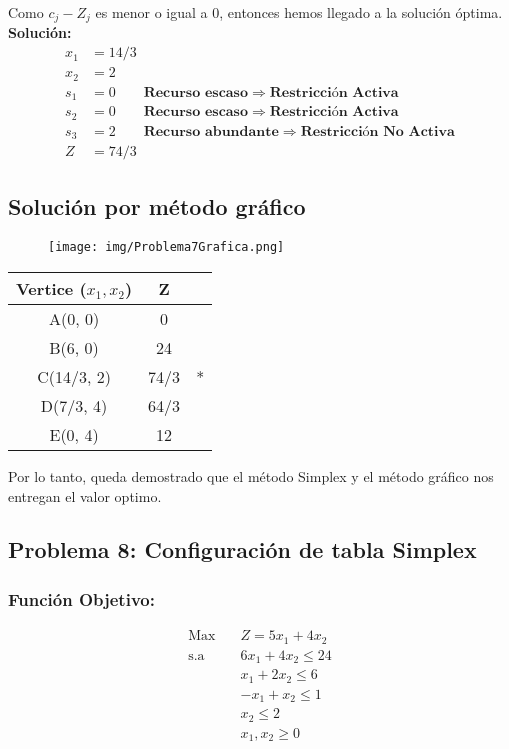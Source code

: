 \documentclass{templateNote}
\begin{document}
Como $c_j - Z_j$ es menor o igual a 0, entonces hemos llegado a la solución óptima.
\textbf{Solución:}
\begin{align*}
    x_1 &= 14/3 \\
    x_2 &= 2 \\
    s_1 &= 0 \qquad \textbf{Recurso escaso} \Rightarrow \textbf{Restricción Activa}\\
    s_2 &= 0 \qquad \textbf{Recurso escaso} \Rightarrow \textbf{Restricción Activa}\\
    s_3 &= 2 \qquad \textbf{Recurso abundante} \Rightarrow \textbf{Restricción No Activa}\\
    Z &= 74/3
\end{align*}

\subsection*{Solución por método gráfico}
\begin{figure}[H]
    \centering
    \texttt{[image: img/Problema7Grafica.png]}
\end{figure}

\begin{center}
    \begin{tabular}{|c|c|c|}
        \hline
        \textbf{Vertice ($x_1,x_2$)} & Z &  \\ \hline
        A(0, 0) & 0 & \\ \hline
        B(6, 0) & 24 & \\ \hline
        C(14/3, 2) & 74/3 & * \\ \hline
        D(7/3, 4) & 64/3 & \\ \hline
        E(0, 4) & 12 & \\ \hline
    \end{tabular}
\end{center}

Por lo tanto, queda demostrado que el método Simplex y el método gráfico nos entregan el valor optimo.
\newpage

\subsection*{Problema 8: Configuración de tabla Simplex}
\subsubsection*{Función Objetivo:}
\begin{equation*}
    \begin{aligned}
        \text{Max} \quad & Z = 5x_1 + 4x_2\\
        \text{s.a} \quad & 6x_1 + 4x_2 \leq 24 \\
        & x_1 + 2x_2 \leq 6 \\
        & -x_1 + x_2 \leq 1 \\
        & x_2 \leq 2 \\
        & x_1, x_2 \geq 0
    \end{aligned}
\end{equation*}
\end{document}
